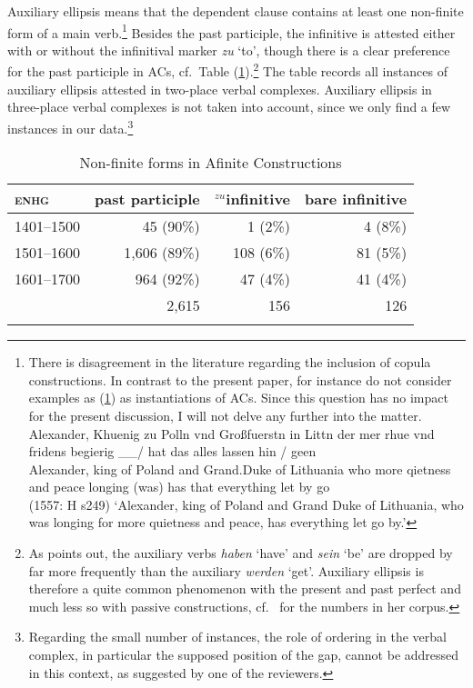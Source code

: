 \documentclass[output=paper,colorlinks,citecolor=brown]{langscibook}
\begin{document}
Auxiliary ellipsis means that the dependent clause contains at least one non-finite form of a main verb.\footnote{There is disagreement in the literature regarding the inclusion of copula constructions. In contrast to the present paper, \citet{ERSW93} for instance do not consider examples as (\ref{copula}) as instantiations of ACs. Since this question has no impact for the present discussion, I will not delve any further into the matter.
\ea \label{copula}
\gll Alexander, Khuenig zu Polln vnd Großfuerstn in Littn der mer rhue vnd fridens begierig \_\_/ hat das alles lassen hin / geen \\ Alexander, king of Poland and Grand.Duke of Lithuania who more qietness and peace longing (was) has that everything let by {} go  \\   \hfill (1557: H s249)
\glt `Alexander, king of Poland and Grand Duke of Lithuania, who was longing for more quietness and peace, has everything let go by.'
\z
} Besides the past participle, the infinitive is attested either with or without the infinitival marker \textit{zu} `to', though there is a clear preference for the past participle in ACs, cf.\ Table (\ref{table2}).\footnote{As \textcite{breitbarth2005} points out, the auxiliary verbs \textit{haben} `have' and \textit{sein} `be' are dropped by far more frequently than the auxiliary \textit{werden} `get'. Auxiliary ellipsis is therefore a quite common phenomenon with the present and past perfect and much less so with passive constructions, cf.\ \textcite[78]{breitbarth2005} for the numbers in her corpus.} The table records all instances of auxiliary ellipsis attested in two-place verbal complexes. Auxiliary ellipsis in three-place verbal complexes is not taken into account, since we only find a few instances in our data.\footnote{Regarding the small number of instances, the role of ordering in the verbal complex, in particular the supposed position of the gap, cannot be addressed in this context, as suggested by one of the reviewers.} 
{\small
\begin{table}
  \centering
  \begin{tabular}{lrrr}
    \lsptoprule
   \textsc{enhg} & \sc past participle & \sc $^{zu}$infinitive & \sc bare infinitive  \\
    \midrule
    1401--1500 & 45 (90\%) & 1 (2\%) & 4 (8\%) \\
    1501--1600 & 1,606 (89\%) & 108 (6\%) & 81 (5\%)  \\
    1601--1700 & 964 (92\%) & 47 (4\%) & 41 (4\%)  \\
    \midrule
    & 2,615 & 156 & 126 \\
    \lspbottomrule
    \end{tabular}
   \caption{Non-finite forms in Afinite Constructions
   \label{table2}}
\end{table}
}
\end{document}
